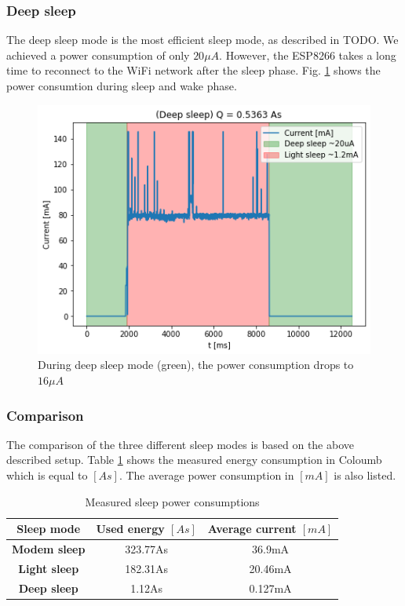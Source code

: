 \subsubsection{Deep sleep}
The deep sleep mode is the most efficient sleep mode, as described in TODO. 
We achieved a power consumption of only $20 \mu A$. 
However, the ESP8266 takes a long time to reconnect to the WiFi network after the sleep phase.
Fig. \ref{fig:deep_sleep} shows the power consumtion during sleep and wake phase.
\begin{figure}[h]
    \includegraphics[width = \linewidth]{fig/deep_sleep.png}
    \caption{During deep sleep mode (green), the power consumption drops to $16 \mu A$}
    \label{fig:deep_sleep}
\end{figure}

\subsubsection{Comparison}
The comparison of the three different sleep modes is based on the above described setup.
Table \ref{tab:sleep_modes_15min} shows the measured energy consumption in Coloumb which is equal to $[As]$.
The average power consumption in $[mA]$ is also listed.

\begin{table}[htbp]
\caption{Measured sleep power consumptions}
\begin{center}
\begin{tabular}{|c|c|c|}
\hline
\textbf{Sleep mode}&\textbf{Used energy $[As]$}&\textbf{Average current $[mA]$}\\
\hline
\textbf{Modem sleep} & 323.77As & 36.9mA\\
\textbf{Light sleep} & 182.31As & 20.46mA\\
\textbf{Deep sleep}  & 1.12As   & 0.127mA\\
\hline
\end{tabular}
\label{tab:sleep_modes_15min}
\end{center}
\end{table}

